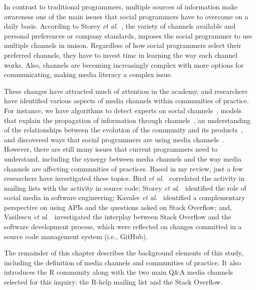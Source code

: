 \documentclass{sig-alternate-05-2015}
\begin{document}
	In contrast to traditional programmers, multiple sources of information make awareness one of the main issues that social programmers have to overcome on a daily basis.
	According to Storey \textit{et al}.~\cite{Storey2010, Storey2014}, the variety of channels available and personal preferences or company standards, imposes the social programmer to use multiple channels in unison.
	Regardless of how social programmers select their preferred channels, they have to invest time in learning the way each channel works.
	Also, channels are becoming increasingly complex with more options for communicating, making media literacy a complex issue.

	These changes have attracted much of attention in the academy, and researchers have identified various aspects of media channels within communities of practice.
	For instance, we have algorithms to detect experts on social channels~\cite{Pal2011a,Pal2012a}, models that explain the propagation of information through channels~\cite{Jin2013, Jiang2013}, an understanding of the relationships between the evolution of the community and its products~\cite{German2013}, and discovered ways that social programmers are using media channels~\cite{Sowe2008a, Singh2009, Parnin2013}. 
	However, there are still many issues that current programmers need to understand, including the synergy between media channels and the way media channels are affecting communities of practices. 
	Based in my review, just a few researchers have investigated these topics. 
	Bird \textit{et al}.~\cite{Bird2006} correlated the activity in mailing lists with the activity in source code;
	Storey \textit{et al}.~\cite{Storey2014, Storey2010} identified the role of social media in software engineering;
	Kavaler \textit{et al}.~\cite{Kavaler2013} identified a complementary perspective on using APIs and the questions asked on Stack Overflow;
	and, Vasilescu \textit{et al}.~\cite{Vasilescu2013a} investigated the interplay between Stack Overflow and the software development process, which were reflected on changes committed in a source code management system (i.e., GitHub).

	The remainder of this chapter describes the background elements of this study, including the definition of media channels and communities of practice. It also introduces the R community along with the two main Q\&A media channels selected for this inquiry: the R-help mailing list and the Stack Overflow. 
\end{document}
